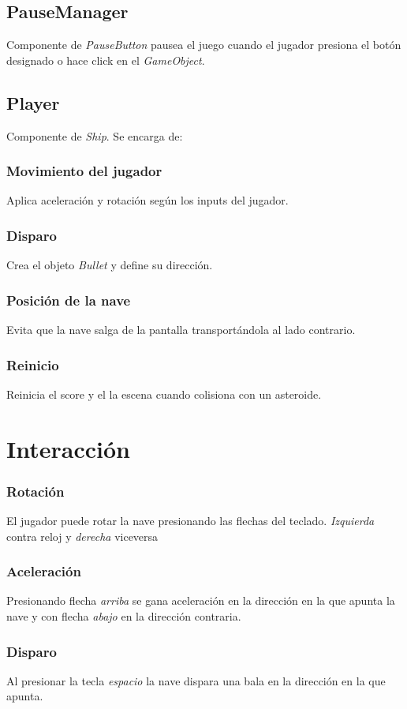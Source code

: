 \documentclass[journal]{IEEEtran}
\begin{document}
\subsection*{PauseManager}
Componente de \textit{PauseButton} pausea el juego cuando el jugador presiona
el botón designado o hace click en el \textit{GameObject}.

\subsection*{Player}
Componente de \textit{Ship}. Se encarga de:

\subsubsection*{Movimiento del jugador}
Aplica aceleración y rotación según los inputs del jugador.
\subsubsection*{Disparo}
Crea el objeto \textit{Bullet} y define su dirección.
\subsubsection*{Posición de la nave}
Evita que la nave salga de la pantalla transportándola al lado contrario.
\subsubsection*{Reinicio}
Reinicia el score y el la escena cuando colisiona con un asteroide.


\section*{Interacción}
\subsubsection*{Rotación}
El jugador puede rotar la nave presionando las flechas del teclado. \textit{Izquierda}
contra reloj y \textit{derecha} viceversa
\subsubsection*{Aceleración}
Presionando flecha \textit{arriba} se gana aceleración en la dirección en la que apunta
la nave y con flecha \textit{abajo} en la dirección contraria.
\subsubsection*{Disparo}
Al presionar la tecla \textit{espacio} la nave dispara una bala en la dirección en la
que apunta.
\end{document}
